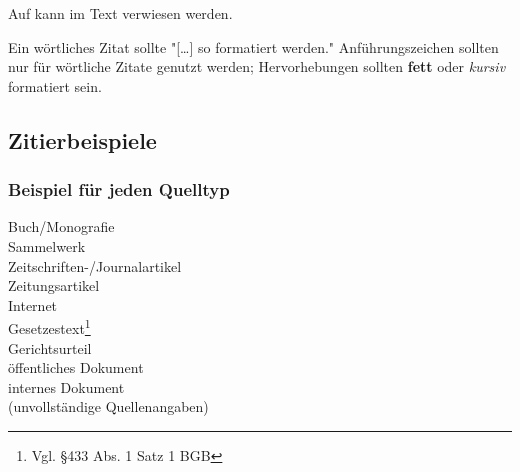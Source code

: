 

Auf  kann im Text verwiesen werden.%

Ein wörtliches Zitat sollte "[\ldots] so formatiert werden."
Anführungszeichen sollten nur für wörtliche Zitate genutzt werden; Hervorhebungen sollten \textbf{fett} oder \textit{kursiv} formatiert sein.

\newpage
\subsection{Zitierbeispiele}
\subsubsection{Beispiel für jeden Quelltyp}%

Buch/Monografie\\
Sammelwerk\\
Zeitschriften-/Journalartikel\\
Zeitungsartikel\\
Internet\\%
Gesetzestext\footnote{Vgl. §433 Abs. 1 Satz 1 BGB}\nocite{bgb}\\
Gerichtsurteil\\
öffentliches Dokument\\
internes Dokument\\%
(unvollständige Quellenangaben)

